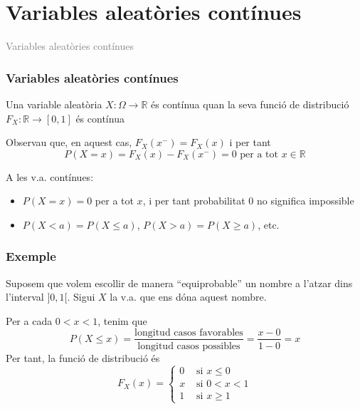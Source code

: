 \documentclass[12pt,t]{beamer}\usepackage[]{graphicx}\usepackage[]{color}
\title[\red{Matemàtiques III}]{}
\author[]{Sebastià Massanet}
\date{}
\newcommand{\gray}[1]{\textcolor{gray}{#1}}
\renewcommand{\emph}[1]{{\color{red}#1}}
\newcommand{\RR}{\mathbb{R}}
\renewcommand{\leq}{\leqslant}
\renewcommand{\geq}{\geqslant}
\theoremstyle{plain}
\theoremstyle{definition}
\begin{document}
\beamertemplatedotitem

\lstset{breaklines=true}
\lstset{basicstyle=\ttfamily}



\section{Variables aleatòries contínues}

\begin{frame}
\vfill
\begin{center}
\gray{\LARGE Variables aleatòries contínues}
\end{center}
\vfill
\end{frame}

\begin{frame} 
        \frametitle{Variables aleatòries contínues}

Una variable aleatòria $X: \Omega\to \RR$ és 
 \emph{contínua} quan la seva funció de distribució $F_X:\RR\to [0,1]$ és contínua \bigskip

Observau que, en aquest cas, $F_{X}(x^{-})=F_{X}(x)$ i per tant
$$
P(X=x)=F_{X}(x)-F_{X}(x^{-})=0 \mbox{ per a tot } x\in \RR
$$

A les v.a. contínues:
\begin{itemize}
\item  $P(X=x)=0$ per a tot $x$, i per tant \emph{probabilitat 0 no significa impossible}
\medskip

\item $P(X<a)=P(X\leq a)$, $P(X>a)=P(X\geq a)$, etc.
\end{itemize}


\end{frame}


\begin{frame}
\frametitle{Exemple}

Suposem que volem escollir de manera ``equiprobable'' un nombre a l'atzar dins l'interval $]0,1[$. Sigui $X$ la v.a. que ens dóna aquest nombre.
\medskip

Per a cada $0<x<1$, tenim que
$$
P(X\leq x)=\frac{\mbox{longitud casos favorables}}{\mbox{longitud casos
possibles}}= \frac{x-0}{1-0}=x
$$
Per tant, la funció de distribució és 
$$
F_X(x)=\left\{\begin{array}{ll} 0 &\mbox{ si } x\leq 0 \\
x  & \mbox{ si } 0<x<1\\
1 & \mbox{ si } x\geq 1
 \end{array}\right.
$$
\end{frame}
\end{document}

